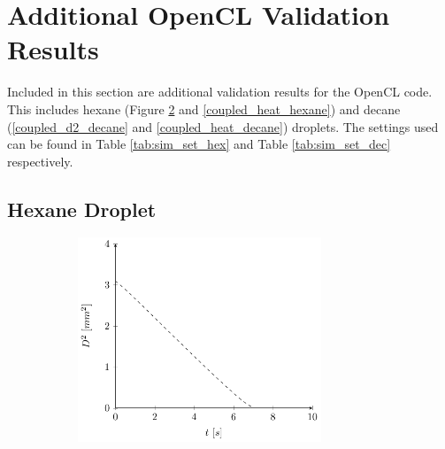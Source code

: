 \documentclass[../Interim_Report_Master]{subfiles}
\begin{document}
\section{Additional OpenCL Validation Results}\label{cl_extra_res}
Included in this section are additional validation results for the OpenCL code. This includes hexane (Figure \ref{coupled_d2_hexane} and \ref{coupled_heat_hexane}) and decane (\ref{coupled_d2_decane} and \ref{coupled_heat_decane}) droplets. The settings used can be found in Table \ref{tab:sim_set_hex} and Table \ref{tab:sim_set_dec} respectively.
\subsection{Hexane Droplet}
\begin{figure}[H]
	\centering
	\begin{subfigure}{\textwidth}
		\centering
		\includegraphics[width=0.8\textwidth]{./Diagrams/OpenCL_Coupled_Heat_Mass_Transfer_Verification/Coupled_D2_Transfer_Hexane.pdf}
		\caption{}
		\label{coupled_d2_hexane}
	\end{subfigure}
\end{figure}
\end{document}
